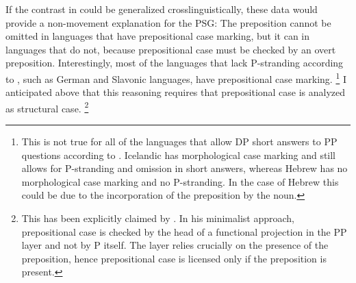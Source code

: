 \begin{sloppypar}\noindent
If the contrast in \LLast could be generalized crosslinguistically, these data would provide a non-movement explanation for the PSG: The preposition cannot be omitted in languages that have prepositional case marking, but it can in languages that do not, because prepositional case must be checked by an overt preposition. Interestingly, most of the languages that lack P-stranding according to \citet{merchant2004}, such as German and Slavonic languages, have prepositional case marking.%
%
\footnote{This is not true for all of the languages that allow DP short answers to PP questions according to \citet{merchant2004}. Icelandic has morphological case marking and still allows for P-stranding and omission in short answers, whereas Hebrew has no morphological case marking and no P-stranding. In the case of Hebrew this could be due to the incorporation of the preposition by the noun. %
}\afterfn%
%
I anticipated above that this reasoning requires that prepositional case is analyzed as structural case.%
% 
\footnote{
This has been explicitly claimed by \citet[24]{dendikken2013}. In his minimalist approach, prepositional case is checked by the head of a functional projection in the PP layer and not by P itself. The layer relies crucially on the presence of the preposition, hence prepositional case is licensed only if the preposition is present.}\afterfn%
%

\end{sloppypar}
